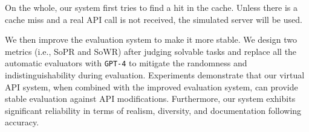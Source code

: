 On the whole, our system first tries to find a hit in the cache.
Unless there is a cache miss and a real API call is not received, the simulated server will be used.

We then improve the evaluation system to make it more stable. We design two metrics (i.e., SoPR and SoWR) after judging solvable tasks and replace all the automatic evaluators with \texttt{GPT-4} to mitigate the randomness and indistinguishability during evaluation.
Experiments demonstrate that our virtual API system, when combined with the improved evaluation system, can provide stable evaluation against API modifications. Furthermore, our system exhibits significant reliability in terms of realism, diversity, and documentation following accuracy.

